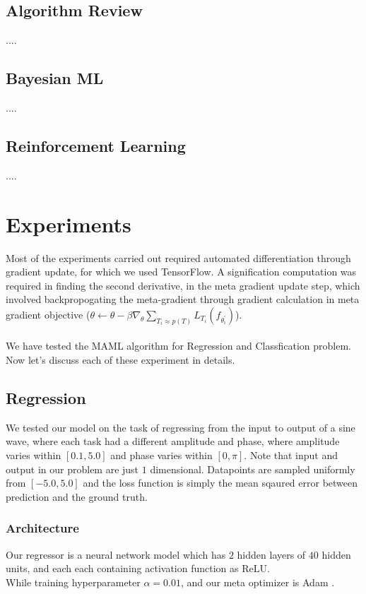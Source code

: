\documentclass[a4paper]{article}
\begin{document}
\subsection*{Algorithm Review}

....

\subsection*{Bayesian ML}

....

\subsection*{Reinforcement Learning}

....

\pagebreak
\section{Experiments}
Most of the experiments carried out required automated differentiation through gradient update, 
for which we used TensorFlow. 
A signification computation was required in finding the second derivative, 
in the meta gradient update step, 
which involved backpropogating the meta-gradient through gradient calculation in meta gradient objective ($\theta \leftarrow \theta - \beta \nabla_\theta \sum_{T_i \approx p(T)} L_{T_i}(f_{\theta^{'}_i}) $). \\ \\
We have tested the MAML algorithm for Regression and Classfication problem. Now let's discuss each of these experiment in details.

\subsection{Regression}
We tested our model on the task of regressing from the input to output of a sine wave,
where each task had a different amplitude and phase, where amplitude varies within $[0.1, 5.0]$ and phase varies within $[0, \pi]$. 
Note that input and output in our problem are just $1$ dimensional. 
Datapoints are sampled uniformly from $[-5.0, 5.0]$ and the loss function is simply the mean sqaured error between prediction and the ground truth.

\subsubsection{Architecture}
Our regressor is a neural network model which has $2$ hidden layers of $40$ hidden units, and each each containing activation function as ReLU. \\
While training hyperparameter $\alpha = 0.01$, and our meta optimizer is Adam \cite{adam}. 
\end{document}
